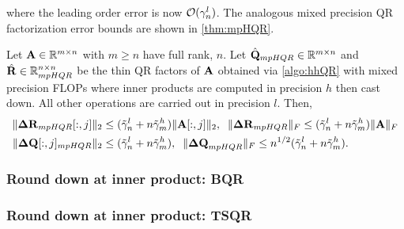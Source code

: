 where the leading order error is now $\mathcal{O}(\gamma_n^l)$.
The analogous mixed precision QR factorization error bounds are shown in \cref{thm:mpHQR}.
\begin{theorem}
	\label{thm:mpHQR}
	Let $\mathbf{A}\in\mathbb{R}^{m\times n}$ with $m\geq n$ have full rank, $n$. 
	Let $\hat{\mathbf{Q}}_{mpHQR}\in\mathbb{R}^{m\times n}$ and $\hat{\mathbf{R}}\in\mathbb{R}^{n\times n}_{mpHQR}$ be the thin QR factors of $\mathbf{A}$ obtained via \cref{algo:hhQR} with mixed precision FLOPs where inner products are computed in precision $h$ then cast down.
	All other operations are carried out in precision $l$.
	Then,
	\begin{align*}
	\|\mathbf{\Delta R}_{mpHQR}[:,j]\|_2&\leq (\tilde{\gamma}_n^l+n\tilde{\gamma}_m^h) \|\mathbf{A}[:,j]\|_2,\;\; \|\mathbf{\Delta R}_{mpHQR}\|_F\leq (\tilde{\gamma}_n^l+n\tilde{\gamma}_m^h) \|\mathbf{A}\|_F\\
	\|\mathbf{\Delta Q}[:,j]_{mpHQR}\|_2&\leq (\tilde{\gamma}_n^l+n\tilde{\gamma}_m^h),\;\; \|\mathbf{\Delta Q}_{mpHQR}\|_F \leq n^{1/2} (\tilde{\gamma}_n^l+n\tilde{\gamma}_m^h).
	\end{align*}
\end{theorem}


\subsubsection{Round down at inner product: BQR}




\subsubsection{Round down at inner product: TSQR}
